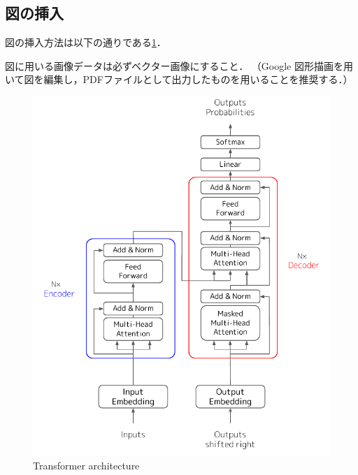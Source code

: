 \subsection{図の挿入}

図の挿入方法は以下の通りである\ref{fig:transformer}．

図に用いる画像データは必ずベクター画像にすること．
（Google 図形描画を用いて図を編集し，PDFファイルとして出力したものを用いることを推奨する．）

\begin{figure}[hbtp]
  \centering
  \includegraphics[width=0.6\linewidth]{fig/transformer.pdf}
  \caption{Transformer architecture}
  \label{fig:transformer}
\end{figure}
